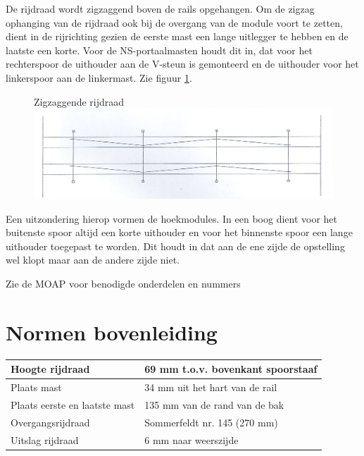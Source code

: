 \documentclass[12pt,a4paper]{report}
\begin{document}
De rijdraad wordt zigzaggend boven de rails opgehangen. Om de zigzag ophanging van de rijdraad ook bij de overgang van de module voort te zetten, dient in de rijrichting gezien de eerste mast een lange uitlegger te hebben en de laatste een korte. Voor de NS-portaalmasten houdt dit in, dat voor het rechterspoor de uithouder  aan de V-steun is gemonteerd en de uithouder voor het linkerspoor aan de linkermast. Zie figuur \ref{figuur10}.

\begin{figure}[ht]
  \captionbox
  {Zigzaggende rijdraad\label{figuur10}}
  {\includegraphics[scale=1.0]{images/rcu_figuur10}}
\end{figure}

Een uitzondering hierop vormen de hoekmodules. In een boog dient voor het buitenste spoor altijd een korte uithouder en voor het binnenste spoor een lange uithouder toegepast te worden. Dit houdt in dat aan de ene zijde de opstelling wel klopt maar aan de andere zijde niet.

Zie de MOAP voor benodigde onderdelen en nummers

\section{Normen bovenleiding}

\begin{tabular}{| l | l |}
\hline
\cellcolor[gray]{0.84}Hoogte rijdraad&69 mm t.o.v. bovenkant spoorstaaf\\
\hline
\cellcolor[gray]{0.84}Plaats mast&34 mm uit het hart van de rail\\
\hline
\cellcolor[gray]{0.84}Plaats eerste en laatste mast&135 mm van de rand van de bak\\
\hline
\cellcolor[gray]{0.84}Overgangsrijdraad&Sommerfeldt nr. 145 (270 mm)\\
\hline
\cellcolor[gray]{0.84}Uitslag rijdraad&6 mm naar weerszijde\\
\hline
\end{tabular}
\\
\end{document}
